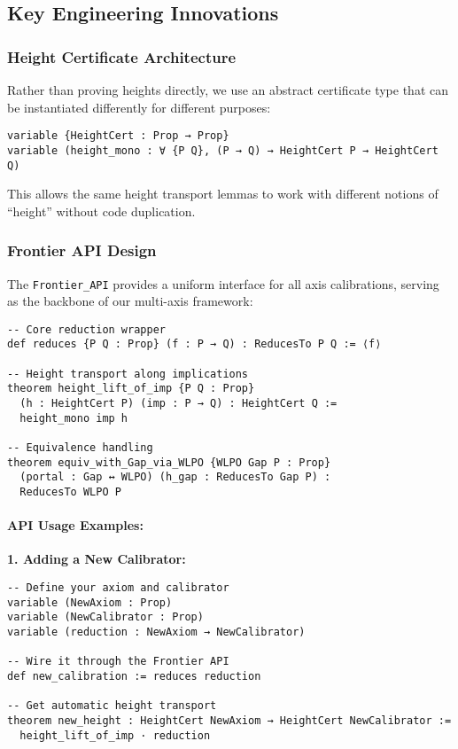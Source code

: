 \documentclass[11pt]{article}
\theoremstyle{plain}
\theoremstyle{definition}
\begin{document}
\subsection{Key Engineering Innovations}

\subsubsection{Height Certificate Architecture}

Rather than proving heights directly, we use an abstract certificate type that can be instantiated differently for different purposes:

\begin{verbatim}
variable {HeightCert : Prop → Prop}
variable (height_mono : ∀ {P Q}, (P → Q) → HeightCert P → HeightCert Q)
\end{verbatim}

This allows the same height transport lemmas to work with different notions of ``height'' without code duplication.

\subsubsection{Frontier API Design}

The \texttt{Frontier\_API} provides a uniform interface for all axis calibrations, serving as the backbone of our multi-axis framework:

\begin{verbatim}
-- Core reduction wrapper
def reduces {P Q : Prop} (f : P → Q) : ReducesTo P Q := ⟨f⟩

-- Height transport along implications  
theorem height_lift_of_imp {P Q : Prop} 
  (h : HeightCert P) (imp : P → Q) : HeightCert Q :=
  height_mono imp h

-- Equivalence handling
theorem equiv_with_Gap_via_WLPO {WLPO Gap P : Prop} 
  (portal : Gap ↔ WLPO) (h_gap : ReducesTo Gap P) : 
  ReducesTo WLPO P
\end{verbatim}

\paragraph{API Usage Examples:}

\textbf{1. Adding a New Calibrator:}
\begin{verbatim}
-- Define your axiom and calibrator
variable (NewAxiom : Prop)
variable (NewCalibrator : Prop)
variable (reduction : NewAxiom → NewCalibrator)

-- Wire it through the Frontier API
def new_calibration := reduces reduction

-- Get automatic height transport
theorem new_height : HeightCert NewAxiom → HeightCert NewCalibrator :=
  height_lift_of_imp · reduction
\end{verbatim}
\end{document}

